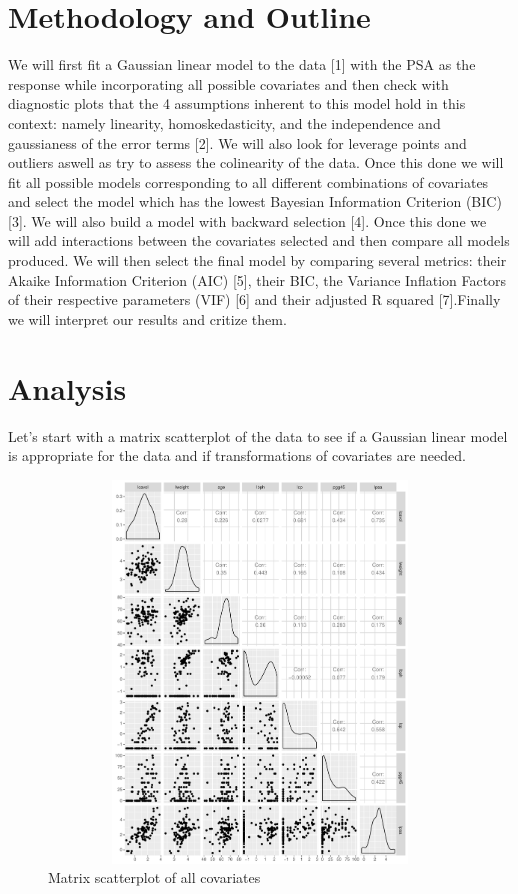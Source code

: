 \documentclass[10pt]{article}
\begin{document}
\section{Methodology and Outline}
\quad  We will first fit a Gaussian linear model to the data [1] with the PSA as the response while incorporating all possible covariates and then check with diagnostic plots that the 4 assumptions inherent to this model hold in this context: namely linearity, homoskedasticity, and the independence and gaussianess of the error terms [2]. We will also look for leverage points and outliers aswell as try to assess the colinearity of the data. Once this done we will fit all possible models corresponding to all different combinations of covariates and select the model which has the lowest Bayesian Information Criterion (BIC) [3]. We will also build a model with backward selection [4]. Once this done we will add interactions between the covariates selected and then compare all models produced. We will then select the final model by comparing several metrics: their Akaike Information Criterion (AIC) [5], their BIC, the Variance Inflation Factors of their respective parameters (VIF) [6] and their adjusted R squared [7].Finally we will interpret our results and critize them.

\section{Analysis}
\quad Let's start with a matrix scatterplot of the data to see if a Gaussian linear model is appropriate for the data and if transformations of covariates are needed. 

\begin{figure}[htb]
\begin{center}
\includegraphics[height=4in,width=5in]{matrixscatterplot.pdf}
\caption{Matrix scatterplot of all covariates}
\end{center}
\end{figure}
\end{document}
